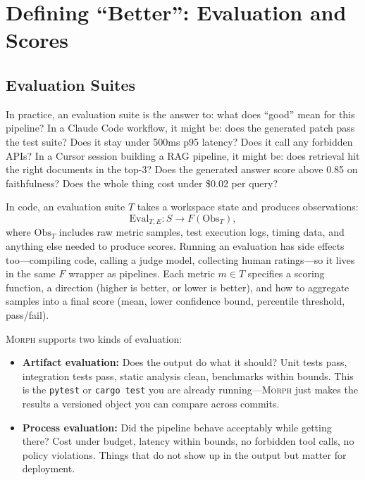 \documentclass{article}
\begin{document}
\section{Defining ``Better'': Evaluation and Scores}
\label{sec:eval}

\subsection{Evaluation Suites}

In practice, an evaluation suite is the answer to: what does ``good'' mean for
this pipeline? In a Claude Code workflow, it might be: does the generated patch
pass the test suite? Does it stay under 500ms p95 latency? Does it call any
forbidden APIs? In a Cursor session building a RAG pipeline, it might be:
does retrieval hit the right documents in the top-3? Does the generated answer
score above 0.85 on faithfulness? Does the whole thing cost under \$0.02 per
query?

In code, an evaluation suite $T$ takes a workspace state and produces
observations:
\begin{equation}
  \text{Eval}_{T,E} : S \to F(\text{Obs}_T),
\end{equation}
where $\text{Obs}_T$ includes raw metric samples, test execution logs, timing
data, and anything else needed to produce scores. Running an evaluation has
side effects too---compiling code, calling a judge model, collecting human
ratings---so it lives in the same $F$ wrapper as pipelines. Each metric
$m \in T$ specifies a scoring function, a direction (higher is better, or
lower is better), and how to aggregate samples into a final score (mean, lower
confidence bound, percentile threshold, pass/fail).

\textsc{Morph} supports two kinds of evaluation:

\begin{itemize}[nosep]
  \item \textbf{Artifact evaluation:} Does the output do what it should?
    Unit tests pass, integration tests pass, static analysis clean, benchmarks
    within bounds. This is the \texttt{pytest} or \texttt{cargo test} you are
    already running---\textsc{Morph} just makes the results a versioned
    object you can compare across commits.
  \item \textbf{Process evaluation:} Did the pipeline behave acceptably while
    getting there? Cost under budget, latency within bounds, no forbidden tool
    calls, no policy violations. Things that do not show up in the output but
    matter for deployment.
\end{itemize}
\end{document}
